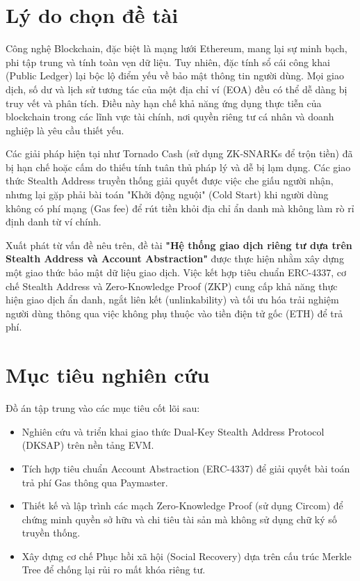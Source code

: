 \documentclass[../DoAn.tex]{subfiles}
\begin{document}
\section{Lý do chọn đề tài}
Công nghệ Blockchain, đặc biệt là mạng lưới Ethereum, mang lại sự minh bạch, phi tập trung và tính toàn vẹn dữ liệu. Tuy nhiên, đặc tính sổ cái công khai (Public Ledger) lại bộc lộ điểm yếu về bảo mật thông tin người dùng. Mọi giao dịch, số dư và lịch sử tương tác của một địa chỉ ví (EOA) đều có thể dễ dàng bị truy vết và phân tích. Điều này hạn chế khả năng ứng dụng thực tiễn của blockchain trong các lĩnh vực tài chính, nơi quyền riêng tư cá nhân và doanh nghiệp là yêu cầu thiết yếu.

Các giải pháp hiện tại như Tornado Cash (sử dụng ZK-SNARKs để trộn tiền) đã bị hạn chế hoặc cấm do thiếu tính tuân thủ pháp lý và dễ bị lạm dụng. Các giao thức Stealth Address truyền thống giải quyết được việc che giấu người nhận, nhưng lại gặp phải bài toán "Khởi động nguội" (Cold Start) khi người dùng không có phí mạng (Gas fee) để rút tiền khỏi địa chỉ ẩn danh mà không làm rò rỉ định danh từ ví chính.

Xuất phát từ vấn đề nêu trên, đề tài \textbf{"Hệ thống giao dịch riêng tư dựa trên Stealth Address và Account Abstraction"} được thực hiện nhằm xây dựng một giao thức bảo mật dữ liệu giao dịch. Việc kết hợp tiêu chuẩn ERC-4337, cơ chế Stealth Address và Zero-Knowledge Proof (ZKP) cung cấp khả năng thực hiện giao dịch ẩn danh, ngắt liên kết (unlinkability) và tối ưu hóa trải nghiệm người dùng thông qua việc không phụ thuộc vào tiền điện tử gốc (ETH) để trả phí.

\section{Mục tiêu nghiên cứu}
Đồ án tập trung vào các mục tiêu cốt lõi sau:
\begin{itemize}
    \item Nghiên cứu và triển khai giao thức Dual-Key Stealth Address Protocol (DKSAP) trên nền tảng EVM.
    \item Tích hợp tiêu chuẩn Account Abstraction (ERC-4337) để giải quyết bài toán trả phí Gas thông qua Paymaster.
    \item Thiết kế và lập trình các mạch Zero-Knowledge Proof (sử dụng Circom) để chứng minh quyền sở hữu và chi tiêu tài sản mà không sử dụng chữ ký số truyền thống.
    \item Xây dựng cơ chế Phục hồi xã hội (Social Recovery) dựa trên cấu trúc Merkle Tree để chống lại rủi ro mất khóa riêng tư.
\end{itemize}
\end{document}

